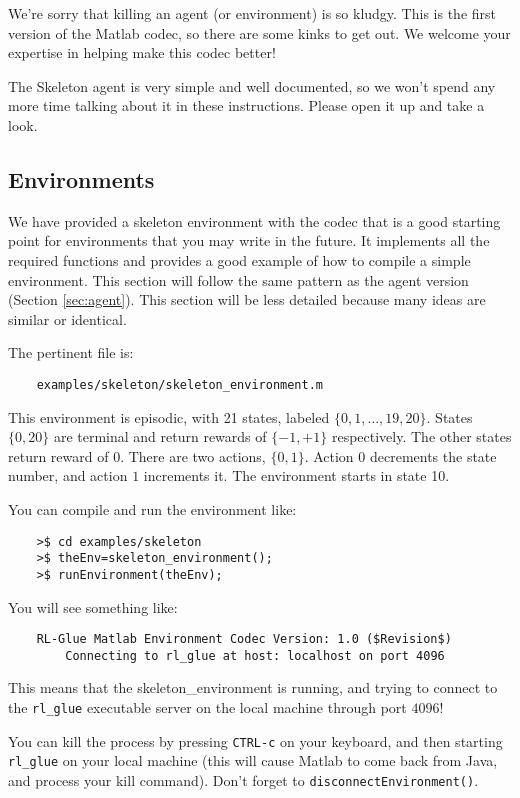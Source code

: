 \documentclass[11pt]{article}
\begin{document}
We're sorry that killing an agent (or environment) is so kludgy.  This is the first version of the Matlab codec, so there are some kinks to get out.  We welcome your expertise in helping 
make this codec better!

The Skeleton agent is very simple and well documented, so we won't spend any more time talking about it in these instructions.
Please open it up and take a look.

\subsection{Environments}
\label{sec:env}

We have provided a skeleton environment with the codec that is a good starting point for environments that you may write in the future.
It implements all the required functions and provides a good example of how to compile a simple environment.  This section will follow the same 
pattern as the agent version (Section \ref{sec:agent}).  This section will be less detailed because many ideas are similar or identical.


The pertinent file is:
\begin{verbatim}
	examples/skeleton/skeleton_environment.m
\end{verbatim}

This environment is episodic, with 21 states, labeled $\{0, 1,\ldots,19,20\}$. States $\{0, 20\}$ are terminal and return rewards of $\{-1, +1\}$ respectively.  The other states return reward of $0$.
There are two actions, $\{0, 1\}$.  Action $0$ decrements the state number, and action $1$ increments it. The environment starts in state 10.

You can compile and run the environment like:
\begin{verbatim}
	>$ cd examples/skeleton
	>$ theEnv=skeleton_environment();
	>$ runEnvironment(theEnv);
\end{verbatim}

You will see something like:
\begin{verbatim}
	RL-Glue Matlab Environment Codec Version: 1.0 ($Revision$)
	    Connecting to rl_glue at host: localhost on port 4096
	\end{verbatim}

This means that the skeleton\_environment is running, and trying to connect to the \texttt{rl\_glue} executable server on the local machine through port $4096$! 

You can kill the process by pressing \texttt{CTRL-c} on your keyboard, and then starting  \texttt{rl\_glue} on your local machine (this will cause Matlab to come back from Java, and 
process your kill command).  Don't forget to \texttt{disconnectEnvironment()}.
\end{document}

